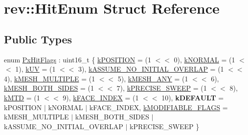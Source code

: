 \hypertarget{structrev_1_1_hit_enum}{}\section{rev\+::Hit\+Enum Struct Reference}
\label{structrev_1_1_hit_enum}
\subsection*{Public Types}
\begin{DoxyCompactItemize}
\item 
enum \mbox{\hyperlink{structrev_1_1_hit_enum_a0084e22d4d5d750565239ebcde227412}{Px\+Hit\+Flags}} \+: uint16\+\_\+t \{ \newline
\mbox{\hyperlink{structrev_1_1_hit_enum_a0084e22d4d5d750565239ebcde227412a62f49f7384a960fb6f0ebaaed1801fd1}{k\+P\+O\+S\+I\+T\+I\+ON}} = (1 $<$$<$ 0), 
\mbox{\hyperlink{structrev_1_1_hit_enum_a0084e22d4d5d750565239ebcde227412a7c8f6b666ac01576451b923a6e540d4d}{k\+N\+O\+R\+M\+AL}} = (1 $<$$<$ 1), 
\mbox{\hyperlink{structrev_1_1_hit_enum_a0084e22d4d5d750565239ebcde227412a9371735a1d136afd9689ab20d1676c3f}{k\+UV}} = (1 $<$$<$ 3), 
\mbox{\hyperlink{structrev_1_1_hit_enum_a0084e22d4d5d750565239ebcde227412a79c31a5d919eca908c7858e9f16a27e7}{k\+A\+S\+S\+U\+M\+E\+\_\+\+N\+O\+\_\+\+I\+N\+I\+T\+I\+A\+L\+\_\+\+O\+V\+E\+R\+L\+AP}} = (1 $<$$<$ 4), 
\newline
\mbox{\hyperlink{structrev_1_1_hit_enum_a0084e22d4d5d750565239ebcde227412a008f8d4e428ccb4f6bdadd735f1fbd26}{k\+M\+E\+S\+H\+\_\+\+M\+U\+L\+T\+I\+P\+LE}} = (1 $<$$<$ 5), 
\mbox{\hyperlink{structrev_1_1_hit_enum_a0084e22d4d5d750565239ebcde227412a94e7aa4d80a6a1263d1e06673a5c8152}{k\+M\+E\+S\+H\+\_\+\+A\+NY}} = (1 $<$$<$ 6), 
\mbox{\hyperlink{structrev_1_1_hit_enum_a0084e22d4d5d750565239ebcde227412aea0a344595eb1d87af130942fae3781a}{k\+M\+E\+S\+H\+\_\+\+B\+O\+T\+H\+\_\+\+S\+I\+D\+ES}} = (1 $<$$<$ 7), 
\mbox{\hyperlink{structrev_1_1_hit_enum_a0084e22d4d5d750565239ebcde227412acddff8d3f148c70e79cba614c4ecc351}{k\+P\+R\+E\+C\+I\+S\+E\+\_\+\+S\+W\+E\+EP}} = (1 $<$$<$ 8), 
\newline
\mbox{\hyperlink{structrev_1_1_hit_enum_a0084e22d4d5d750565239ebcde227412a1fc23501f8155ff0b1b3ca1ae5b250da}{k\+M\+TD}} = (1 $<$$<$ 9), 
\mbox{\hyperlink{structrev_1_1_hit_enum_a0084e22d4d5d750565239ebcde227412af896aa0e12bc03b763db5852fb01ed39}{k\+F\+A\+C\+E\+\_\+\+I\+N\+D\+EX}} = (1 $<$$<$ 10), 
{\bfseries k\+D\+E\+F\+A\+U\+LT} = k\+P\+O\+S\+I\+T\+I\+ON $\vert$ k\+N\+O\+R\+M\+AL $\vert$ k\+F\+A\+C\+E\+\_\+\+I\+N\+D\+EX, 
\mbox{\hyperlink{structrev_1_1_hit_enum_a0084e22d4d5d750565239ebcde227412a4dd8bb414be4e91c2232a0dd79362a8b}{k\+M\+O\+D\+I\+F\+I\+A\+B\+L\+E\+\_\+\+F\+L\+A\+GS}} = k\+M\+E\+S\+H\+\_\+\+M\+U\+L\+T\+I\+P\+LE $\vert$ k\+M\+E\+S\+H\+\_\+\+B\+O\+T\+H\+\_\+\+S\+I\+D\+ES $\vert$ k\+A\+S\+S\+U\+M\+E\+\_\+\+N\+O\+\_\+\+I\+N\+I\+T\+I\+A\+L\+\_\+\+O\+V\+E\+R\+L\+AP $\vert$ k\+P\+R\+E\+C\+I\+S\+E\+\_\+\+S\+W\+E\+EP
 \}
\end{DoxyCompactItemize}


